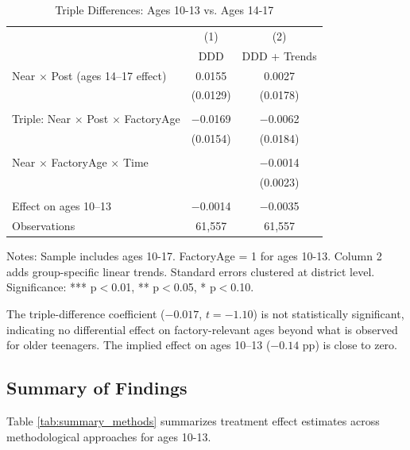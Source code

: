 \documentclass[12pt]{article}
\begin{document}
\begin{table}[H]
\centering
\caption{Triple Differences: Ages 10-13 vs. Ages 14-17}
\label{tab:triple_diff}
\begin{threeparttable}
\begin{tabular}{lcc}
\toprule
& (1) & (2) \\
& DDD & DDD + Trends \\
\midrule
Near $\times$ Post (ages 14--17 effect) & 0.0155 & 0.0027 \\
& (0.0129) & (0.0178) \\
\\
Triple: Near $\times$ Post $\times$ FactoryAge & $-$0.0169 & $-$0.0062 \\
& (0.0154) & (0.0184) \\
\\
Near $\times$ FactoryAge $\times$ Time & & $-$0.0014 \\
& & (0.0023) \\
\\
\midrule
Effect on ages 10--13 & $-$0.0014 & $-$0.0035 \\
Observations & 61,557 & 61,557 \\
\bottomrule
\end{tabular}
\begin{tablenotes}
\footnotesize
\item Notes: Sample includes ages 10-17. FactoryAge = 1 for ages 10-13. Column 2 adds group-specific linear trends. Standard errors clustered at district level. Significance: *** p$<$0.01, ** p$<$0.05, * p$<$0.10.
\end{tablenotes}
\end{threeparttable}
\end{table}

The triple-difference coefficient ($-0.017$, $t = -1.10$) is not statistically significant, indicating no differential effect on factory-relevant ages beyond what is observed for older teenagers. The implied effect on ages 10--13 ($-0.14$ pp) is close to zero.

\subsection{Summary of Findings}

Table \ref{tab:summary_methods} summarizes treatment effect estimates across methodological approaches for ages 10-13.
\end{document}
